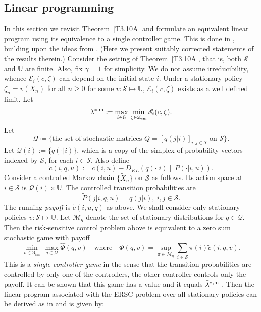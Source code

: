 \documentclass[notitlepage,11pt,reqno]{amsart}
\numberwithin{equation}{section}
\theoremstyle{plain}
\theoremstyle{definition}
\theoremstyle{remark}
\newcommand{\Act}{{\mathds{U}}}
\newcommand{\sE}{{\mathscr{E}}}     %
\newcommand{\cS}{{\mathcal{S}}}     %
\newcommand{\Usm}{\mathfrak{U}_{\mathrm{sm}}}
\newcommand{\df}{\coloneqq}
\begin{document}
\subsection{Linear programming}
In this section we revisit Theorem~\ref{T3.10A}
and formulate an equivalent linear program using its equivalence to a single controller game.  This is done in \cite{9683319}, building upon the ideas from \cite{BorkarCDC}. (Here we present suitably corrected statements of the results therein.) Consider the
setting of Theorem~\ref{T3.10A}, that is, both $\cS$ and $\Act$ are finite.
Also, fix $\gamma=1$ for simplicity.
We do not assume irreducibility, whence
$\sE_i(c,\zeta)$ can depend on the initial state $i$. Under a stationary policy $\zeta_n = v(X_n)$ for all $ n \geq 0$ for some $v: \cS \mapsto \Act$, $\sE_i(c,\zeta)$ exists as a well defined limit. 
Let 
$$
\bar\lambda^{*,{\rm m}}\df \max_{i\in\cS}\,\min_{\zeta\in\Usm}\sE_i(c,\zeta).
$$ 
Let 
$$
\mathcal{Q}\df\{\text{the set of stochastic matrices $Q = [q(j|i)]_{i,j\in\cS}$ on $\cS$}\}.
$$
Let $\mathcal{Q}(i) := \{q(\cdot|i)\}$, which is a copy of the simplex of probability vectors indexed by $\cS$, for each $i\in\cS$. Also define
$$\tilde{c}(i,q,u) := c(i,u) - D_{KL}(q(\cdot|i)\|P(\cdot|i,u)).$$
Consider a controlled Markov chain 
$\{\tilde{X}_n\}$ on $\cS$ as follows. Its action space at $i\in\cS$ is 
$\mathcal{Q}(i)\times\Act$. The controlled transition probabilities are
$$
\tilde{P}(j|i,q,u) = q(j|i), \ i,j\in\cS.
$$
The running \textit{payoff} is $\tilde{c}(i,u,q)$ as above. We shall consider only stationary policies $v: \cS \mapsto \Act$. Let $\mathcal{M}_q$ denote the set of stationary distributions for $q\in \mathcal{Q}$.
Then the risk-sensitive control problem above is equivalent to a zero sum stochastic game with payoff
$$
\min_{v\in\Usm}\, \max_{q\in\mathcal{Q}}\widehat\Phi(q, v)\quad
\text{where}\quad
\widehat\Phi(q, v)=\sup_{\pi\in\mathcal{M}_q}\sum_{i\in\cS}\pi(i)\tilde{c}(i, q, v).
$$
This is a \textit{single controller game} \cite{Filar}
 in the sense that the transition probabilities are controlled by only one of the controllers, the other controller controls only the payoff. It can be shown that this game has a value and it equals $\bar\lambda^{*,{\rm m}}$ \cite{9683319}.
Then the linear program associated with the ERSC problem  over all stationary policies can be derived as in \cite{V1981} and is given by:
\end{document}
